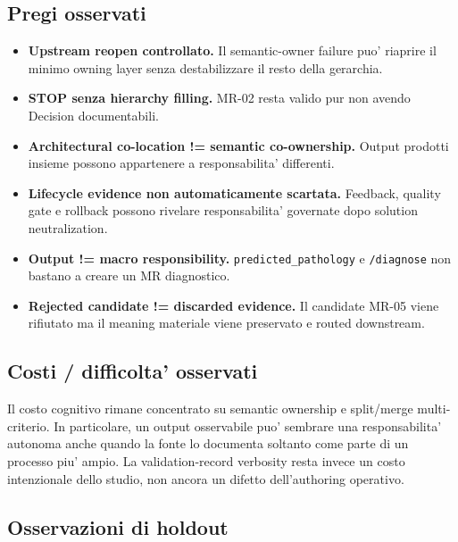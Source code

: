 \documentclass[11pt,a4paper]{article}
\begin{document}
\subsection{Pregi osservati}

\begin{itemize}
  \item \textbf{Upstream reopen controllato.} Il semantic-owner failure puo' riaprire il minimo owning layer senza destabilizzare il resto della gerarchia.
  \item \textbf{STOP senza hierarchy filling.} MR-02 resta valido pur non avendo Decision documentabili.
  \item \textbf{Architectural co-location != semantic co-ownership.} Output prodotti insieme possono appartenere a responsabilita' differenti.
  \item \textbf{Lifecycle evidence non automaticamente scartata.} Feedback, quality gate e rollback possono rivelare responsabilita' governate dopo solution neutralization.
  \item \textbf{Output != macro responsibility.} \texttt{predicted\_pathology} e \texttt{/diagnose} non bastano a creare un MR diagnostico.
  \item \textbf{Rejected candidate != discarded evidence.} Il candidate MR-05 viene rifiutato ma il meaning materiale viene preservato e routed downstream.
\end{itemize}

\subsection{Costi / difficolta' osservati}

Il costo cognitivo rimane concentrato su semantic ownership e split/merge multi-criterio. In particolare, un output osservabile puo' sembrare una responsabilita' autonoma anche quando la fonte lo documenta soltanto come parte di un processo piu' ampio. La validation-record verbosity resta invece un costo intenzionale dello studio, non ancora un difetto dell'authoring operativo.

\subsection{Osservazioni di holdout}
\end{document}
